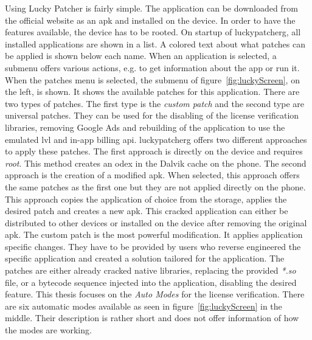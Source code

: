 Using Lucky Patcher is fairly simple.
The application can be downloaded from the official website \cite{luckyPatcherOfficial} as an \gls{apk} and installed on the device.
In order to have the features available, the device has to be rooted.
On startup of \gls{luckypatcherg}, all installed applications are shown in a list.
A colored text about what patches can be applied is shown below each name.
When an application is selected, a submenu offers various actions, e.g. to get information about the app or run it.
\newline
\newline
When the patches menu is selected, the submenu of figure~\ref{fig:luckyScreen}, on the left, is shown.
It shows the available patches for this application.
There are two types of patches.
The first type is the \textit{custom patch} and the second type are universal patches.
They can be used for the disabling of the license verification libraries, removing Google Ads and rebuilding of the application to use the emulated \gls{lvl} and in-app billing \gls{api}.
\newline
\gls{luckypatcherg} offers two different approaches to apply these patches.
The first approach is directly on the device and requires \textit{root}.
This method creates an \gls{odex} in the Dalvik cache on the phone.
The second approach is the creation of a modified \gls{apk}.
When selected, this approach offers the same patches as the first one but they are not applied directly on the phone.
This approach copies the application of choice from the storage, applies the desired patch and creates a new \gls{apk}.
This cracked application can either be distributed to other devices or installed on the device after removing the original \gls{apk}.
\newline
The custom patch is the most powerful modification.
It applies application specific changes.
They have to be provided by users who reverse engineered the specific application and created a solution tailored for the application.
The patches are either already cracked native libraries, replacing the provided \textit{*.so} file, or a bytecode sequence injected into the application, disabling the desired feature.
\newline
This thesis focuses on the \textit{Auto Modes} for the license verification.
There are six automatic modes available as seen in figure~\ref{fig:luckyScreen} in the middle.
Their description is rather short and does not offer information of how the modes are working.
\newline
